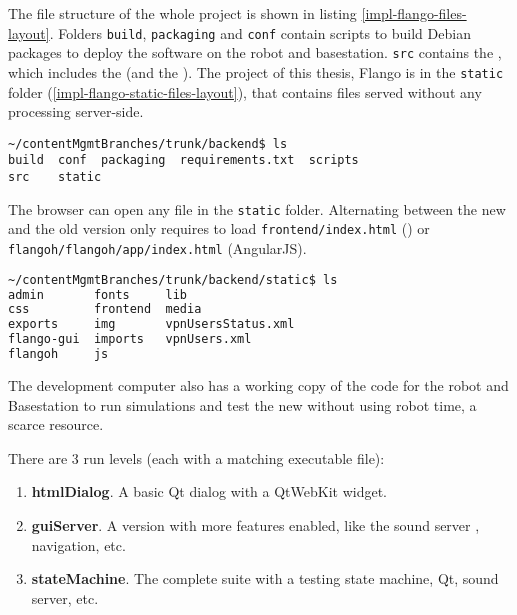 The file structure of the whole project is shown in listing \ref{impl-flango-files-layout}.
Folders \texttt{build}, \texttt{packaging} and \texttt{conf} contain scripts to build Debian packages to deploy the software on the robot and basestation.
\texttt{src} contains the \flangobe , which includes the \flangofe (and the \se).
The project of this thesis, Flango \cm is in the \texttt{static} folder (\ref{impl-flango-static-files-layout}), that contains files served without any processing server-side.

\begin{lstlisting}[columns=fixed,caption=Flango files layout, label=impl-flango-files-layout]
~/contentMgmtBranches/trunk/backend$ ls
build  conf  packaging  requirements.txt  scripts
src    static
\end{lstlisting}

The browser can open any file in the \texttt{static} folder.
Alternating between the new and the old version only requires to load \texttt{frontend/index.html} (\flash) or \texttt{flangoh/flangoh/app/index.html} (AngularJS).

\begin{lstlisting}[columns=fixed,language=bash,caption=Flango static files layout, label=impl-flango-static-files-layout]
~/contentMgmtBranches/trunk/backend/static$ ls
admin       fonts     lib
css         frontend  media
exports     img       vpnUsersStatus.xml
flango-gui  imports   vpnUsers.xml
flangoh     js        
\end{lstlisting}

The development computer also has a working copy of the code for the robot and Basestation to run simulations and test the new \cm  without using robot time, a scarce resource.

There are 3 run levels (each with a matching executable file):
\begin{enumerate}
\item \textbf{htmlDialog}. A basic Qt dialog with a QtWebKit widget.
\item \textbf{guiServer}. A version with more features enabled, like the sound server , navigation, etc.
\item \textbf{stateMachine}. The complete suite with a testing state machine, Qt, sound server, etc.
\end{enumerate}


